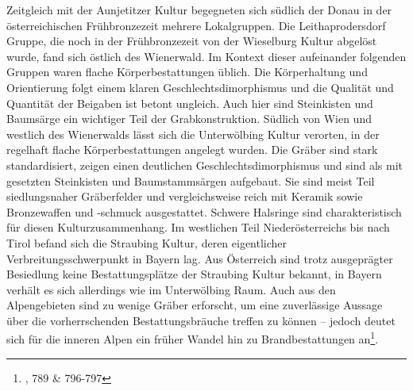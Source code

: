 \documentclass[openany,twoside,twocolumn]{book}
\let\rmarkdownfootnote\footnote%
\def\footnote{\protect\rmarkdownfootnote}
\begin{document}
Zeitgleich mit der Aunjetitzer Kultur begegneten sich südlich der Donau
in der österreichischen Frühbronzezeit mehrere Lokalgruppen. Die
Leithaprodersdorf Gruppe, die noch in der Frühbronzezeit von der
Wieselburg Kultur abgelöst wurde, fand sich östlich des Wienerwald. Im
Kontext dieser aufeinander folgenden Gruppen waren flache
Körperbestattungen üblich. Die Körperhaltung und Orientierung folgt
einem klaren Geschlechtsdimorphismus und die Qualität und Quantität der
Beigaben ist betont ungleich. Auch hier sind Steinkisten und Baumsärge
ein wichtiger Teil der Grabkonstruktion. Südlich von Wien und westlich
des Wienerwalds lässt sich die Unterwölbing Kultur verorten, in der
regelhaft flache Körperbestattungen angelegt wurden. Die Gräber sind
stark standardisiert, zeigen einen deutlichen Geschlechtsdimorphismus
und sind als mit gesetzten Steinkisten und Baumstammsärgen aufgebaut.
Sie sind meist Teil siedlungsnaher Gräberfelder und vergleichsweise
reich mit Keramik sowie Bronzewaffen und -schmuck ausgestattet. Schwere
Halsringe sind charakteristisch für diesen Kulturzusammenhang. Im
westlichen Teil Niederösterreichs bis nach Tirol befand sich die
Straubing Kultur, deren eigentlicher Verbreitungsschwerpunkt in Bayern
lag. Aus Österreich sind trotz ausgeprägter Besiedlung keine
Bestattungsplätze der Straubing Kultur bekannt, in Bayern verhält es
sich allerdings wie im Unterwölbing Raum. Auch aus den Alpengebieten
sind zu wenige Gräber erforscht, um eine zuverlässige Aussage über die
vorherrschenden Bestattungsbräuche treffen zu können -- jedoch deutet
sich für die inneren Alpen ein früher Wandel hin zu Brandbestattungen
an\footnote{\textcite{lubos_czech_2013}, 789 \& 796-797}.
\end{document}

